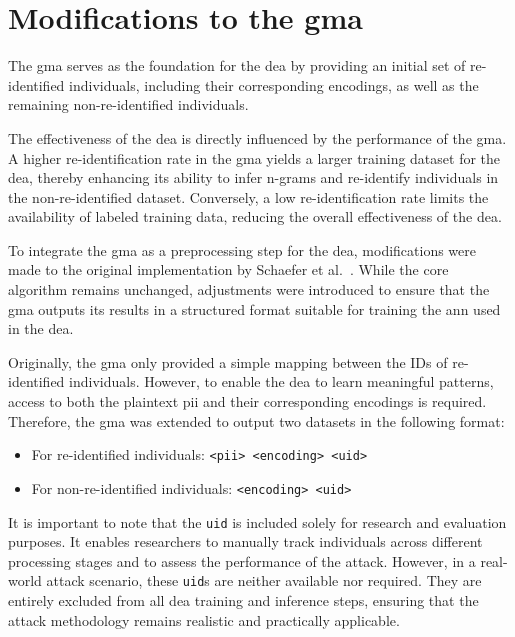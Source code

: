 \section{Modifications to the \ac{gma}} \label{sec:modifications}

The \ac{gma} serves as the foundation for the \ac{dea} by providing an initial set of re-identified individuals, including their corresponding encodings, as well as the remaining non-re-identified individuals.

The effectiveness of the \ac{dea} is directly influenced by the performance of the \ac{gma}.
A higher re-identification rate in the \ac{gma} yields a larger training dataset for the \ac{dea}, thereby enhancing its ability to infer n-grams and re-identify individuals in the non-re-identified dataset.
Conversely, a low re-identification rate limits the availability of labeled training data, reducing the overall effectiveness of the \ac{dea}.

To integrate the \ac{gma} as a preprocessing step for the \ac{dea}, modifications were made to the original implementation by Schaefer et al.~\cite{schaefer2024}.
While the core algorithm remains unchanged, adjustments were introduced to ensure that the \ac{gma} outputs its results in a structured format suitable for training the \ac{ann} used in the \ac{dea}.

Originally, the \ac{gma} only provided a simple mapping between the IDs of re-identified individuals.
However, to enable the \ac{dea} to learn meaningful patterns, access to both the plaintext \ac{pii} and their corresponding encodings is required.
Therefore, the \ac{gma} was extended to output two datasets in the following format:

\begin{itemize}
    \item For re-identified individuals: \texttt{<\ac{pii}> <encoding> <uid>}
    \item For non-re-identified individuals: \texttt{<encoding> <uid>}
\end{itemize}

It is important to note that the \texttt{uid} is included solely for research and evaluation purposes.
It enables researchers to manually track individuals across different processing stages and to assess the performance of the attack.
However, in a real-world attack scenario, these \texttt{uid}s are neither available nor required.
They are entirely excluded from all \ac{dea} training and inference steps, ensuring that the attack methodology remains realistic and practically applicable.

